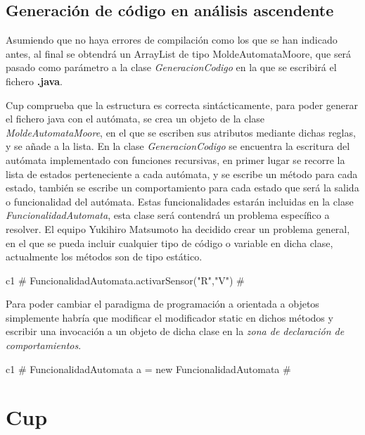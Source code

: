 \documentclass[12pt,a4paper]{article}
\begin{document}
\subsection{Generación de código en análisis ascendente}

Asumiendo que no haya errores de compilación como los que se han indicado antes, al final se obtendrá un ArrayList de tipo MoldeAutomataMoore, que será pasado como parámetro a la clase \textit{GeneracionCodigo} en la que se escribirá el fichero \textbf{.java}.\newline

Cup comprueba que la estructura es correcta sintácticamente, para poder generar el fichero java con el autómata, se crea un objeto de la clase \textit{MoldeAutomataMoore}, en el que se escriben sus atributos mediante dichas reglas, y se añade a la lista. \newline
En la clase \textit{GeneracionCodigo} se encuentra la escritura del autómata implementado con funciones recursivas, en primer lugar se recorre la lista de estados perteneciente a cada autómata, y se escribe un método para cada estado, también se escribe un comportamiento para cada estado que será la salida o funcionalidad del autómata. \newline\newline
Estas funcionalidades estarán incluidas en la clase \textit{FuncionalidadAutomata}, esta clase será contendrá un problema específico a resolver. El equipo Yukihiro Matsumoto ha decidido crear un problema general, en el que se pueda incluir cualquier tipo de código o variable en dicha clase, actualmente los métodos son de tipo estático.
\begin{center}
c1	$\#$ FuncionalidadAutomata.activarSensor("R","V") $\#$ 
\end{center}


Para poder cambiar el paradigma de programación a orientada a objetos simplemente habría que modificar el modificador static en dichos métodos y escribir una invocación a un objeto de dicha clase en la \textit{zona de declaración de comportamientos}.
\begin{center}
c1	$\#$ FuncionalidadAutomata a = new FuncionalidadAutomata\(\) $\#$ 
\end{center}




\section{Cup}
\end{document}
